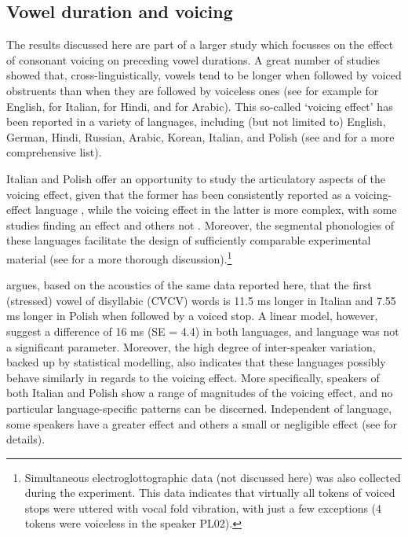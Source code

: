 \documentclass[preprint]{JASAnew}
\begin{document}
\hypertarget{vowel-duration-and-voicing}{%
\subsection{Vowel duration and
voicing}\label{vowel-duration-and-voicing}}

The results discussed here are part of a larger study which focusses on
the effect of consonant voicing on preceding vowel durations. A great
number of studies showed that, cross-linguistically, vowels tend to be
longer when followed by voiced obstruents than when they are followed by
voiceless ones (see for example
\citealt{house1953, peterson1960, chen1970, klatt1973, lisker1974, fowler1992}
for English, \citealt{farnetani1986, esposito2002} for Italian,
\citealt{lampp2004, durvasula2012} for Hindi, and \citealt{hussein1994}
for Arabic). This so-called `voicing effect' has been reported in a
variety of languages, including (but not limited to) English, German,
Hindi, Russian, Arabic, Korean, Italian, and Polish (see
\citealt{maddieson1976} and \citealt{begus2017} for a more comprehensive
list).

Italian and Polish offer an opportunity to study the articulatory
aspects of the voicing effect, given that the former has been
consistently reported as a voicing-effect language
\citep{caldognetto1979, farnetani1986, esposito2002}, while the voicing
effect in the latter is more complex, with some studies finding an
effect \citep{slowiaczek1985, nowak2006, malisz2008, coretta2018j} and
others not \citep{keating1984, jassem1989}. Moreover, the segmental
phonologies of these languages facilitate the design of sufficiently
comparable experimental material (see \citealt{coretta2018j} for a more
thorough
discussion).\footnote{Simultaneous electroglottographic data (not discussed here) was also collected during the experiment. This data indicates that virtually all tokens of voiced stops were uttered with vocal fold vibration, with just a few exceptions (4 tokens were voiceless in the speaker PL02).}

\citet{coretta2018j} argues, based on the acoustics of the same data
reported here, that the first (stressed) vowel of disyllabic (CV́CV)
words is 11.5 ms longer in Italian and 7.55 ms longer in Polish when
followed by a voiced stop. A linear model, however, suggest a difference
of 16 ms (SE = 4.4) in both languages, and language was not a
significant parameter. Moreover, the high degree of inter-speaker
variation, backed up by statistical modelling, also indicates that these
languages possibly behave similarly in regards to the voicing effect.
More specifically, speakers of both Italian and Polish show a range of
magnitudes of the voicing effect, and no particular language-specific
patterns can be discerned. Independent of language, some speakers have a
greater effect and others a small or negligible effect (see
\citealt{coretta2018j} for details).
\end{document}
